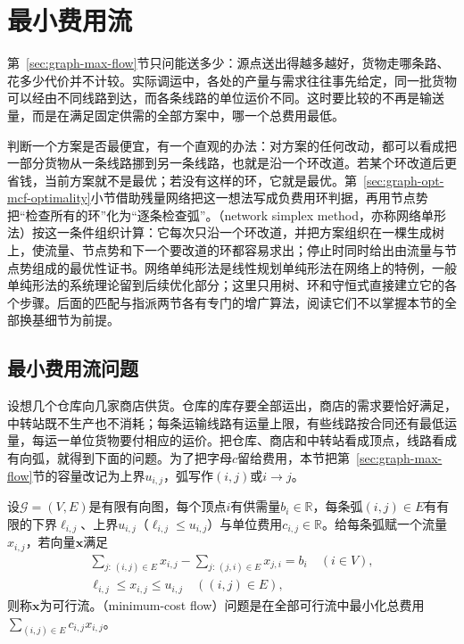 
\section{最小费用流}
\label{sec:graph-min-cost-flow}

第~\ref{sec:graph-max-flow}节只问能送多少：源点送出得越多越好，货物走哪条路、花多少代价并不计较。实际调运中，各处的产量与需求往往事先给定，同一批货物可以经由不同线路到达，而各条线路的单位运价不同。这时要比较的不再是输送量，而是在满足固定供需的全部方案中，哪一个总费用最低。

判断一个方案是否最便宜，有一个直观的办法：对方案的任何改动，都可以看成把一部分货物从一条线路挪到另一条线路，也就是沿一个环改道。若某个环改道后更省钱，当前方案就不是最优；若没有这样的环，它就是最优。第~\ref{sec:graph-opt-mcf-optimality}小节借助残量网络把这一想法写成负费用环判据，再用节点势把“检查所有的环”化为“逐条检查弧”。（network simplex method，亦称网络单形法）按这一条件组织计算：它每次只沿一个环改道，并把方案组织在一棵生成树上，使流量、节点势和下一个要改道的环都容易求出；停止时同时给出由流量与节点势组成的最优性证书。网络单纯形法是线性规划单纯形法在网络上的特例，一般单纯形法的系统理论留到后续优化部分；这里只用树、环和守恒式直接建立它的各个步骤。后面的匹配与指派两节各有专门的增广算法，阅读它们不以掌握本节的全部换基细节为前提。

\subsection{最小费用流问题}
\label{sec:graph-opt-mcf-problem}

设想几个仓库向几家商店供货。仓库的库存要全部运出，商店的需求要恰好满足，中转站既不生产也不消耗；每条运输线路有运量上限，有些线路按合同还有最低运量，每运一单位货物要付相应的运价。把仓库、商店和中转站看成顶点，线路看成有向弧，就得到下面的问题。为了把字母$c$留给费用，本节把第~\ref{sec:graph-max-flow}节的容量改记为上界$u_{i,j}$，弧写作$(i,j)$或$i\to j$。

\begin{definition}[最小费用流问题]
\label{def:graph-opt-min-cost-flow}
设$\mathcal G=(V,E)$是有限有向图，每个顶点$i$有供需量$b_i\in\mathbb R$，每条弧$(i,j)\in E$有有限的下界$\ell_{i,j}$、上界$u_{i,j}$（$\ell_{i,j}\leq u_{i,j}$）与单位费用$c_{i,j}\in\mathbb R$。给每条弧赋一个流量$x_{i,j}$，若向量$\bm x$满足
\begin{equation}
\begin{gathered}
  \sum_{j:\,(i,j)\in E}x_{i,j}-\sum_{j:\,(j,i)\in E}x_{j,i}=b_i\quad(i\in V),\\
  \ell_{i,j}\leq x_{i,j}\leq u_{i,j}\quad((i,j)\in E),
\end{gathered}
  \label{eq:graph-opt-mcf-constraints}
\end{equation}
则称$\bm x$为可行流。（minimum-cost flow）问题是在全部可行流中最小化总费用$\sum_{(i,j)\in E}c_{i,j}x_{i,j}$。
\end{definition}

